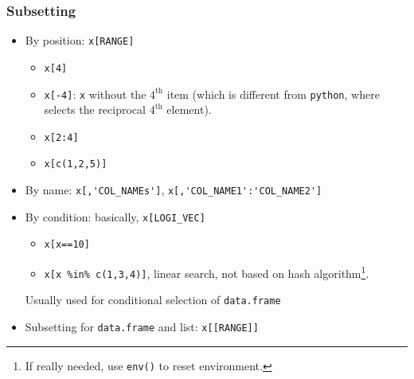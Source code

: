 \subsubsection{Subsetting}
\begin{itemize}[topsep=2pt,itemsep=0pt]
    \item By position: \lstinline|x[RANGE]|
    \begin{itemize}[topsep=2pt,itemsep=0pt]
        \item \lstinline|x[4]|
        \item \lstinline|x[-4]|: \lstinline|x| without the $ 4^\mathrm{th} $ item (which is different from \lstinline|python|, where selects the  reciprocal $ \mathrm{4^{th}}  $ element).
        \item \lstinline|x[2:4]|
        \item \lstinline|x[c(1,2,5)]|
    \end{itemize}
    \item By name: \lstinline|x[,'COL_NAMEs']|, \lstinline|x[,'COL_NAME1':'COL_NAME2']|
    \item By condition: basically, \lstinline|x[LOGI_VEC]|
    \begin{itemize}[topsep=2pt,itemsep=0pt]
        \item \lstinline|x[x==10]|
        \item \lstinline|x[x %in% c(1,3,4)]|, linear search, not based on hash algorithm\footnote{If really needed, use \lstinline|env()| to reset environment.}.
    \end{itemize}

    Usually used for conditional selection of \lstinline|data.frame|
    \item Subsetting for \lstinline|data.frame| and list: \lstinline|x[[RANGE]]|



\end{itemize}
